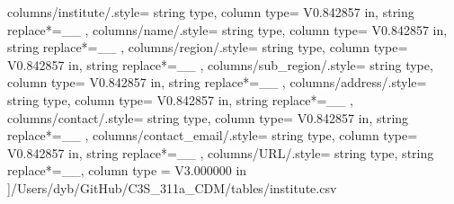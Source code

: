 \begin{landscape}
    columns/institute/.style={
            string type, 
            column type= V{0.842857 in}, 
            string replace*={_}{\_}
        },
    columns/name/.style={
            string type, 
            column type= V{0.842857 in}, 
            string replace*={_}{\_}
        },
    columns/region/.style={
            string type, 
            column type= V{0.842857 in}, 
            string replace*={_}{\_}
        },
    columns/sub_region/.style={
            string type, 
            column type= V{0.842857 in}, 
            string replace*={_}{\_}
        },
    columns/address/.style={
            string type, 
            column type= V{0.842857 in}, 
            string replace*={_}{\_}
        },
    columns/contact/.style={
            string type, 
            column type= V{0.842857 in}, 
            string replace*={_}{\_}
        },
    columns/contact_email/.style={
            string type, 
            column type= V{0.842857 in}, 
            string replace*={_}{\_}
        },
    columns/URL/.style={
            string type, 
            string replace*={_}{\_},
            column type = V{3.000000 in}
        }
    ]{/Users/dyb/GitHub/C3S_311a_CDM/tables/institute.csv}
\end{landscape}
